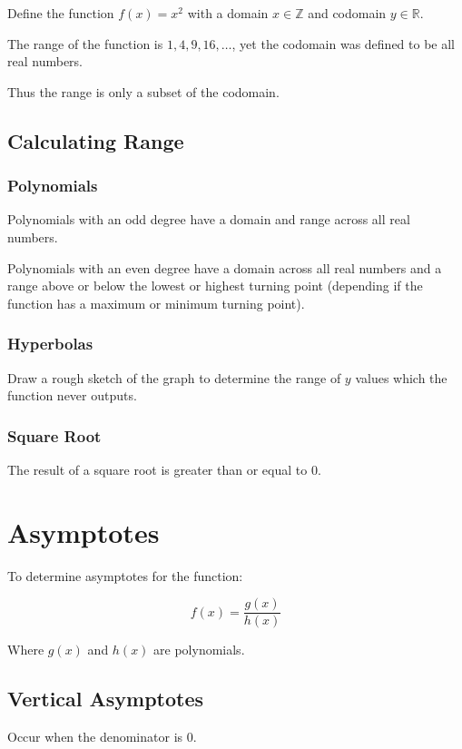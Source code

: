 \documentclass[a4paper,11pt]{report}
\begin{document}
Define the function $f(x) = x^2$ with a domain $x \in \mathbb{Z}$ and codomain
$y \in \mathbb{R}$.

The range of the function is ${1, 4, 9, 16, \ldots}$, yet the codomain was
defined to be all real numbers.

Thus the range is only a subset of the codomain.

\subsection{Calculating Range}

\subsubsection{Polynomials}

Polynomials with an odd degree have a domain and range across all real numbers.

Polynomials with an even degree have a domain across all real numbers and a
range above or below the lowest or highest turning point (depending if the
function has a maximum or minimum turning point).

\subsubsection{Hyperbolas}

Draw a rough sketch of the graph to determine the range of $y$ values which the
function never outputs.

\subsubsection{Square Root}

The result of a square root is greater than or equal to 0.


\section{Asymptotes}

To determine asymptotes for the function:

$$
f(x) = \frac{g(x)}{h(x)}
$$

Where $g(x)$ and $h(x)$ are polynomials.

\subsection{Vertical Asymptotes}

Occur when the denominator is 0.
\end{document}
